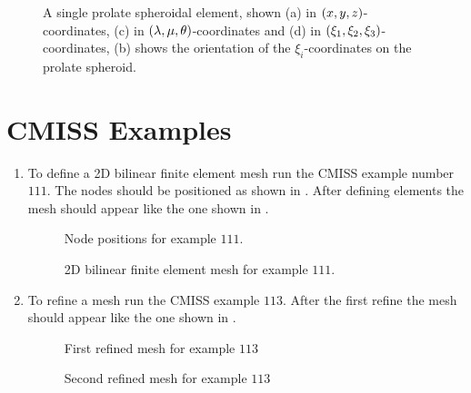\begin{figure}[h] \centering
  
  \caption{A single prolate spheroidal element, shown (a) in 
    $\left( x,y,z \right)$-coordinates, (c) in $\left( \lambda, \mu,
      \theta \right)$-coordinates and (d) in
    $\left( \xi_{1},\xi_{2},\xi_{3} \right)$-coordinates, (b) shows the orientation
    of the $\xi_{i}$-coordinates on the prolate spheroid.}
  \label{fig:spse}
\end{figure}

\clearpage

\section{CMISS Examples}

\begin{enumerate}
\item  To define a 2D bilinear finite element mesh run the CMISS example number
  $111$.  The nodes should be positioned as shown in .
  After defining elements the mesh should appear like the one shown in
  .

  \begin{figure}[htbp] \centering
    
    \caption{Node positions for example $111$.}
    \label{fig:example111_node}
  \end{figure}

   \begin{figure}[hbtp] \centering
    
    \caption{2D bilinear finite element mesh for example $111$.}
    \label{fig:example111_elem}
  \end{figure} 
  \label{xmp:Def2D}

\item  To refine a mesh run the CMISS example $113$. After the first refine the
  mesh should appear like the one shown in .  
  \begin{figure}[htbp] \centering
    
    \caption{First refined mesh for example $113$}
    \label{fig:example113}
  \end{figure}
  \begin{figure}[htbp] \centering
    
    \caption{Second refined mesh for example $113$}
    \label{fig:example113b}
  \end{figure}
  \label{xmp:Refining}


\end{enumerate}
